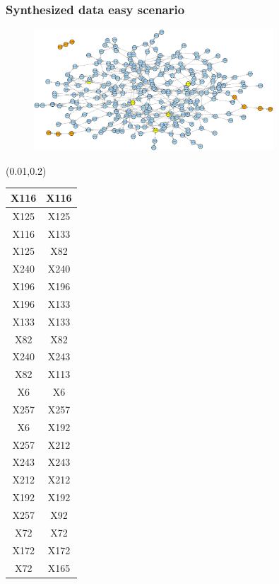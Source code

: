 \documentclass{beamer}
\newcommand{\boz}{\cellcolor{pathwaynode}}
\newcommand{\ghool}{\cellcolor{independentnode}}
\begin{document}
\begin{frame}[plain]
  \frametitle{Synthesized data easy scenario}
  \begin{figure}
    \includegraphics[width=0.8\textwidth]{synthesized-easy}
  \end{figure}
  \begin{textblock*}{\paperwidth}(0.01\textwidth,0.2\textheight)
    \raggedright 
    \tiny
    \begin{tabular}{| c c |}
      \hline
\boz X116   &  \boz X116  \\ \hline
\boz X125   &  \boz X125  \\ \hline
\boz X116   &  \boz X133  \\ \hline
\boz X125   &  \boz X82  \\ \hline
\boz X240   &  \boz X240  \\ \hline
\boz X196   &  \boz X196  \\ \hline
\boz X196   &  \boz X133  \\ \hline
\boz X133   &  \boz X133  \\ \hline
\boz X82   &  \boz X82  \\ \hline
\boz X240   &  \boz X243  \\ \hline
\boz X82   &  \boz X113  \\ \hline
X6   &  X6  \\ \hline
\ghool X257   &  \ghool X257  \\ \hline
X6   &  X192  \\ \hline
\ghool X257   &  X212  \\ \hline
\boz X243   &  \boz X243  \\ \hline
X212   &  X212  \\ \hline
X192   &  X192  \\ \hline
\ghool X257   &  X92  \\ \hline
X72   &  X72  \\ \hline
X172   &  X172  \\ \hline
X72   &  X165  \\ \hline

\end{tabular}
\end{textblock*}
\end{frame}
\end{document}
